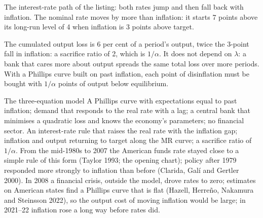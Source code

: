 \begin{omfigure}

{\small The interest-rate path of the listing: both rates jump and then fall back with inflation. The nominal rate moves by
more than inflation: it starts 7 points above its long-run level of 4 when inflation is 3 points above target.}
\end{omfigure}

The cumulated output loss is 6 per cent of a period's output, twice the 3-point fall in inflation: a sacrifice ratio of 2, which is $1/\alpha$. It does not depend on $\lambda$: a
bank that cares more about output spreads the same total loss over more periods. With a Phillips curve built on past
inflation, each point of disinflation must be bought with $1/\alpha$ points of output below equilibrium.

\begin{model}{The three-equation model}
\assumes A Phillips curve with expectations equal to past inflation; demand that responds to the real rate with a lag; a
central bank that minimises a quadratic loss and knows the economy's parameters; no financial sector.
\predicts An interest-rate rule that raises the real rate with the inflation gap; inflation and output returning to
target along the MR curve; a sacrifice ratio of $1/\alpha$.
\tested From the mid-1980s to 2007 the American funds rate stayed close to a simple rule of this form (Taylor 1993; the
opening chart); policy after 1979 responded more strongly to inflation than before (Clarida, Gal\'i and Gertler 2000).
\breaks In 2008 a financial crisis, outside the model, drove rates to zero; estimates on American states find a Phillips
curve that is flat (Hazell, Herre\~no, Nakamura and Steinsson 2022), so the output cost of moving inflation would be large; in 2021--22 inflation rose a
long way before rates did.
\end{model}

